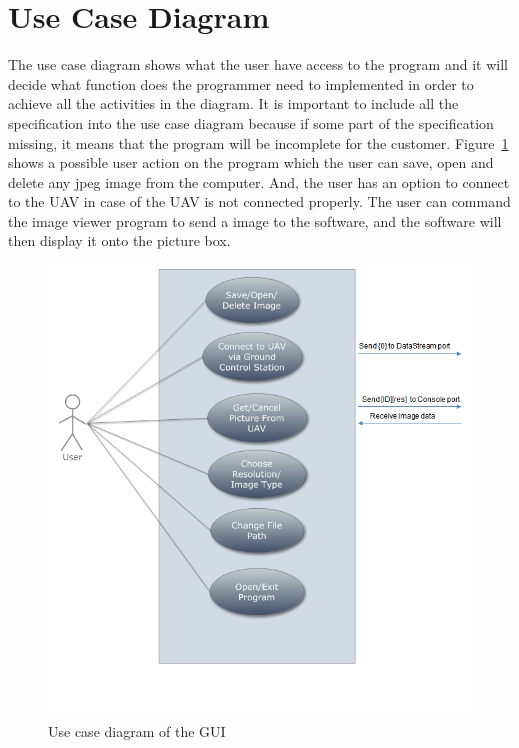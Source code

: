 \section{Use Case Diagram}
The use case diagram shows what the user have access to the program and it will decide what function does the programmer need to implemented in order to achieve all the activities in the diagram.
It is important to include all the specification into the use case diagram because if some part of the specification missing, it means that the program will be incomplete for the customer.
Figure~\ref{GUI_useCase} shows a possible user action on the program which the user can save, open and delete any jpeg image from the computer. 
And, the user has an option to connect to the UAV in case of the UAV is not connected properly.
The user can command the image viewer program to send a image to the software, and the software will then display it onto the picture box.
\begin{figure}[H]
\begin{center}
\includegraphics[scale=0.6]{figures/userCase.png} 
\end{center}
\caption{Use case diagram of the GUI\label{GUI_useCase}}
\end{figure}

